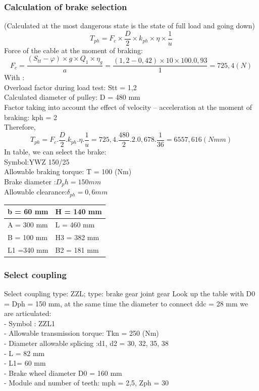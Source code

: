 \subsubsection{Calculation of brake selection}
(Calculated at the most dangerous state is the state of full load and going down)
$$T_{ph}=F_c\times\frac{D}{2}\times k_{ph}\times\eta\times\frac{1}{u}
$$
Force of the cable at the moment of braking:
$$F_c=\frac{\left(S_{tt}-\varphi\right)\times g\times Q_1\times\eta_g}{a}=\frac{\left(1,2-0,42\right)\times10\times100.0,93}{1}=725,4\left(N\right)$$
With : \\
Overload factor during load test: Stt = 1,2\\
Calculated diameter of pulley: D = 480 mm \\
Factor taking into account the effect of velocity – acceleration at the moment of braking: kph = 2\\
Therefore,
$$T_{ph}=F_c.\frac{D}{2}.k_{ph}.\eta.\frac{1}{u}=725,4.\frac{480}{2}.2.0,678.\frac{1}{36}=6557,616\left(Nmm\right) $$
In table, we can select the brake:\\
	Symbol:YWZ  150/25\\
	 Allowable braking torque: T = 100 (Nm)\\
	  Brake diameter :$D_ph = 150 mm$\\
	Allowable clearance:$\delta_{ph}=0,6mm$
\begin{table}[H]
\begin{center}
\begin{tabular}{|l|l|}

\hline
b = 60 mm  & H = 140 mm  \\ \hline
A = 300 mm & L = 460 mm  \\ \hline
B = 100 mm & H3 = 382 mm \\ \hline
L1 =340 mm & B2 = 181 mm \\ \hline
\end{tabular}
\end{center}
\end{table}

\subsubsection{Select coupling}
Select coupling type: ZZL; type: brake gear joint gear
Look up the table with D0 = Dph = 150 mm, at the same time the diameter to connect ddc = 28 mm we are articulated:\\
-	Symbol : ZZL1\\
-	Allowable transmission torque: Tkn = 250 (Nm)\\
-	Diameter allowable splicing :d1, d2 = 30, 32, 35, 38\\
-	L = 82 mm\\
-	L1= 60 mm\\
-	Brake wheel diameter D0 = 160 mm\\
-	Module and number of teeth: mph = 2,5, Zph = 30\\

